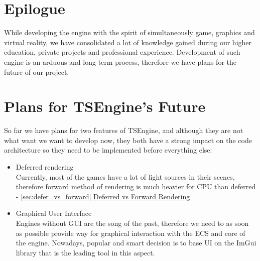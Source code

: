 \section{Epilogue}
While developing the engine with the spirit of simultaneously game, graphics and virtual reality, we have consolidated a lot of knowledge gained during our higher education, private projects and professional experience. Development of such engine is an arduous and long-term process, therefore we have plans for the future of our project. 
\section{Plans for TSEngine's Future}
\label{sec:future}
So far we have plans for two features of TSEngine, and although they are not what want we want to develop now, they both have a strong impact on the code architecture so they need to be implemented before everything else: 
\begin{itemize}
    \item Deferred rendering\\
    Currently, most of the games have a lot of light sources in their scenes, therefore forward method of rendering is much heavier for CPU than deferred - \hyperref[sec:defer_vs_forward]{\ref*{sec:defer_vs_forward} Deferred vs Forward Rendering}
    \item Graphical User Interface\\
    Engines without GUI are the song of the past, therefore we need to as soon as possible provide way for graphical interaction with the ECS and core of the engine. Nowadays, popular and smart decision is to base UI on the ImGui library that is the leading tool in this aspect.  
\end{itemize}